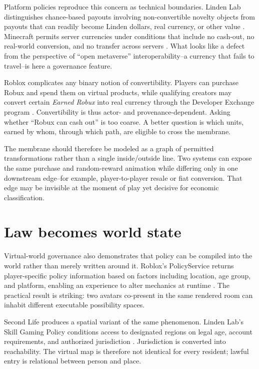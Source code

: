\documentclass[11pt]{article}
\begin{document}
Platform policies reproduce this concern as technical boundaries. Linden Lab distinguishes chance-based payouts involving non-convertible novelty objects from payouts that can readily become Linden dollars, real currency, or other value \parencite{linden_wagering_policy}. Minecraft permits server currencies under conditions that include no cash-out, no real-world conversion, and no transfer across servers \parencite{minecraft_usage_guidelines_2026}. What looks like a defect from the perspective of ``open metaverse'' interoperability--a currency that fails to travel--is here a governance feature.

Roblox complicates any binary notion of convertibility. Players can purchase Robux and spend them on virtual products, while qualifying creators may convert certain \emph{Earned Robux} into real currency through the Developer Exchange program \parencite{roblox_devex_2026}. Convertibility is thus actor- and provenance-dependent. Asking whether ``Robux can cash out'' is too coarse. A better question is which units, earned by whom, through which path, are eligible to cross the membrane.

The membrane should therefore be modeled as a graph of permitted transformations rather than a single inside/outside line. Two systems can expose the same purchase and random-reward animation while differing only in one downstream edge--for example, player-to-player resale or fiat conversion. That edge may be invisible at the moment of play yet decisive for economic classification.

\section{Law becomes world state}
Virtual-world governance also demonstrates that policy can be compiled into the world rather than merely written around it. Roblox's PolicyService returns player-specific policy information based on factors including location, age group, and platform, enabling an experience to alter mechanics at runtime \parencite{roblox_policyservice}. The practical result is striking: two avatars co-present in the same rendered room can inhabit different executable possibility spaces.

Second Life produces a spatial variant of the same phenomenon. Linden Lab's Skill Gaming Policy conditions access to designated regions on legal age, account requirements, and authorized jurisdiction \parencite{linden_skill_policy}. Jurisdiction is converted into reachability. The virtual map is therefore not identical for every resident; lawful entry is relational between person and place.
\end{document}
